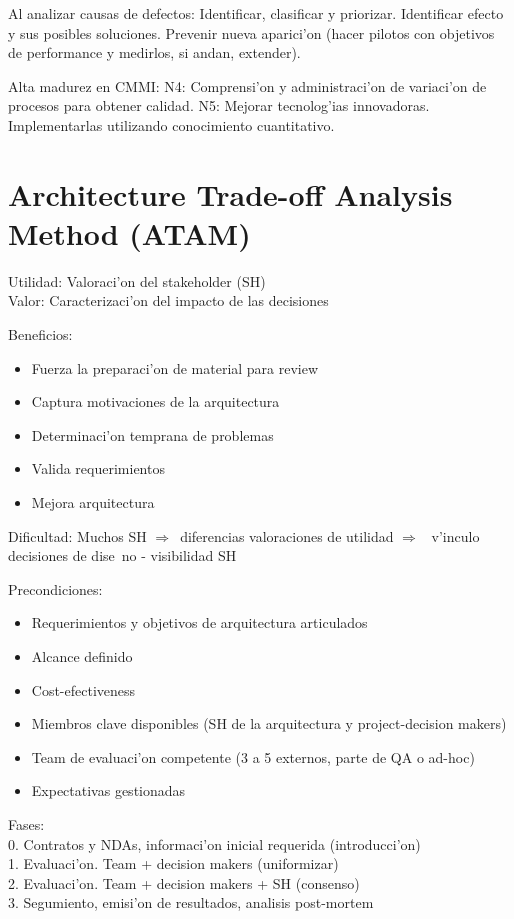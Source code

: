 \documentclass[a4paper,spanish]{article}
\newcommand{\then}[0]{\ensuremath{\Rightarrow}~}
\newenvironment{items}{
		\vspace*{-\topsep}
		\begin{itemize} 
		\addtolength{\itemsep}{-0.5\baselineskip}
		}{\end{itemize}\vspace*{-\topsep}}
\begin{document}
Al analizar causas de defectos: Identificar, clasificar y priorizar. 
	Identificar efecto y sus posibles soluciones. Prevenir nueva aparici'on
	(hacer pilotos con objetivos de performance y medirlos, si andan, 
	extender).

Alta madurez en CMMI: N4: Comprensi'on y administraci'on de variaci'on de 
	procesos para obtener calidad. N5: Mejorar tecnolog'ias innovadoras. 
	Implementarlas utilizando conocimiento cuantitativo.

\section{Architecture Trade-off Analysis Method (ATAM)}

Utilidad: Valoraci'on del stakeholder (SH) \\
Valor: Caracterizaci'on del impacto de las decisiones

Beneficios:
\begin{items}
\item Fuerza la preparaci'on de material para review
\item Captura motivaciones de la arquitectura
\item Determinaci'on temprana de problemas
\item Valida requerimientos
\item Mejora arquitectura
\end{items}

Dificultad: Muchos SH \then diferencias valoraciones de utilidad \then 
	v'inculo decisiones de dise~no - visibilidad SH
	
Precondiciones:
\begin{items}
\item Requerimientos y objetivos de arquitectura articulados
\item Alcance definido
\item Cost-efectiveness
\item Miembros clave disponibles (SH de la arquitectura y project-decision 
	makers)
\item Team de evaluaci'on competente (3 a 5 externos, parte de QA o ad-hoc)
\item Expectativas gestionadas
\end{items}

Fases: \\
0. Contratos y NDAs, informaci'on inicial requerida (introducci'on) \\
1. Evaluaci'on. Team + decision makers (uniformizar) \\
2. Evaluaci'on. Team + decision makers + SH (consenso) \\
3. Segumiento, emisi'on de resultados, analisis post-mortem
\end{document}
